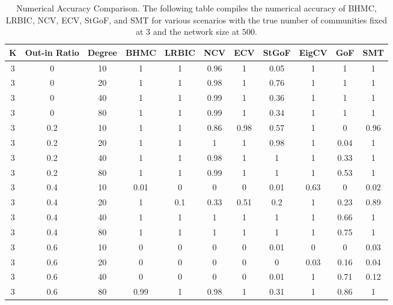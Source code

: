 \documentclass[11pt]{article}
\begin{document}
\begin{table}[H]
\caption{Numerical Accuracy Comparison. The following table compiles the numerical accuracy of BHMC, LRBIC, NCV, ECV, StGoF, and SMT for various scenarios with the true number of communities fixed at $3$ and the network size at $500$.}\label{T4}
\centering
\begin{tabular}{|c| c | c | c| c | c | c | c | c| c| c|}
\hline
K & Out-in Ratio & Degree & BHMC & LRBIC & NCV & ECV & StGoF & EigCV & GoF & SMT 
\\
\hline
3 & 0 & 10 & 1 & 1 & 0.96 & 1 & 0.05 & 1 & 1 & 1 \\
3 & 0 & 20 & 1 & 1 & 0.98 & 1 & 0.76 & 1 & 1 & 1\\
3 & 0 & 40 & 1 & 1 & 0.99 & 1 & 0.36 & 1 & 1 & 1 \\
3 & 0 & 80 & 1 & 1 & 0.99 & 1 & 0.34 & 1 & 1 & 1 \\
\hline
3 & 0.2 & 10 & 1 & 1 & 0.86 & 0.98 & 0.57 & 1 & 0 & 0.96 \\
3 & 0.2 & 20 & 1 & 1 & 1 & 1 & 0.98 & 1 & 0.04 & 1\\
3 & 0.2 & 40 & 1 & 1 & 0.98 & 1 & 1 & 1 & 0.33 & 1 \\
3 & 0.2 & 80 & 1 & 1 & 0.99 & 1 & 1 & 1 & 0.53 & 1 \\
\hline
3 & 0.4 & 10 & 0.01 & 0 & 0 & 0 & 0.01 & 0.63 & 0 & 0.02 \\
3 & 0.4 & 20 & 1 & 0.1 & 0.33 & 0.51 & 0.2 & 1 & 0.23 & 0.89\\
3 & 0.4 & 40 & 1 & 1 & 1 & 1 & 1 & 1 & 0.66 & 1 \\
3 & 0.4 & 80 & 1 & 1 & 1 & 1 & 1 & 1 & 0.75 & 1 \\
\hline
3 & 0.6 & 10 & 0 & 0 & 0 & 0 & 0.01 & 0 & 0 & 0.03 \\
3 & 0.6 & 20 & 0 & 0 & 0 & 0 & 0 & 0.03 & 0.16 & 0.04\\
3 & 0.6 & 40 & 0 & 0 & 0 & 0 & 0.01 & 1 & 0.71 & 0.12 \\
3 & 0.6 & 80 & 0.99 & 1 & 0.98 & 1 & 0.31 & 1 & 0.86 & 1 \\
\hline
\end{tabular}
\end{table}
\end{document}

